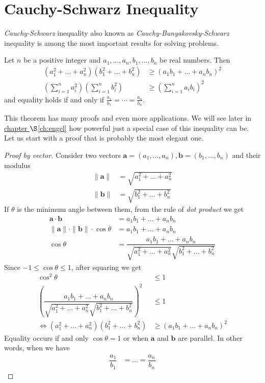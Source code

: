 \documentclass{subfile}
\begin{document}
	\section{Cauchy-Schwarz Inequality}\label{sec:cs}
	\textit{Cauchy-Schwarz} inequality also known as \textit{Cauchy-Bunyakovsky-Schwarz} inequality is among the most important results for solving problems.
		\begin{theorem}
			Let $n$ be a positive integer and $a_1,\ldots,a_n,b_1,\ldots,b_n$ be real numbers. Then
				\begin{align*}
					(a_1^2+\ldots+a_n^2)(b_1^2+\ldots+b_n^2)
						& \geq(a_1b_1+\ldots+a_nb_n)^2\\
					\left(\sum_{i=1}^na_i^2\right)\left(\sum_{i=1}^nb_i^2\right)
						& \geq\left(\sum_{i=1}^na_ib_i\right)^2
				\end{align*}
			and equality holds if and only if $\frac{a_1}{b_1}=\cdots=\frac{a_n}{b_n}$.
		\end{theorem}
	
	This theorem has many proofs and even more applications. We will see later in \hyperref[ch:engel]{chapter $\S$\ref{ch:engel}} how powerful just a special case of this inequality can be. Let us start with a proof that is probably the most elegant one.
	
		\begin{proof}[Proof by vector]
			Consider two vectors $\mathbf{a}=(a_1,\ldots,a_n),\mathbf{b}=(b_1,\ldots,b_n)$ and their modulus
				\begin{align*}
					\|\mathbf{a}\|
						& = \sqrt{a_1^2+\ldots+a_n^2}\\
					\|\mathbf{b}\|
						& = \sqrt{b_1^2+\ldots+b_n^2}
				\end{align*}
			If $\theta$ is the minimum angle between them, from the rule of \textit{dot product} we get
				\begin{align*}
					\mathbf{a}\cdot\mathbf{b}
						& = a_1b_1+\ldots+a_nb_n\\
					\|\mathbf{a}\|\cdot\|\mathbf{b}\|\cdot\cos\theta
						& = a_1b_1+\ldots+a_nb_n\\
					\cos{\theta}
						& = \dfrac{a_1b_1+\ldots+a_nb_n}{\sqrt{a_1^2+\ldots+a_n^2}\sqrt{b_1^2+\ldots+b_n^2}}
				\end{align*}
			Since $-1\leq\cos\theta\leq1$, after squaring we get
				\begin{align*}
					\cos^2\theta
						& \leq1\\
					\left(\dfrac{a_1b_1+\ldots+a_nb_n}{\sqrt{a_1^2+\ldots+a_n^2}\sqrt{b_1^2+\ldots+b_n^2}}\right)^2
						& \leq1\\
					\iff (a_1^2+\ldots+a_n^2)(b_1^2+\ldots+b_n^2)
						& \geq(a_1b_1+\ldots+a_nb_n)^2
				\end{align*}
			Equality occurs if and only $\cos\theta=1$ or when $\mathbf{a}$ and $\mathbf{b}$ are parallel. In other words, when we have
				\begin{align*}
					\dfrac{a_1}{b_1}& = \ldots=\dfrac{a_n}{b_n}
				\end{align*}
		\end{proof}
	
\end{document}
